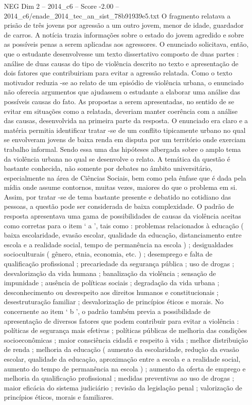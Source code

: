 \begin{textsample}{NEG Dim 2 – 2014\_c6 – Score -2.00 – 2014\_c6/enade\_2014\_tec\_an\_sist\_78b91939e5.txt}
O fragmento relatava a prisão de três jovens por agressão a um outro jovem, menor de idade, guardador de carros.
A notícia trazia informações sobre o estado do jovem agredido e sobre as possíveis penas a serem aplicadas aos agressores.
O enunciado solicitava, então, que o estudante desenvolvesse um texto dissertativo composto de duas partes : análise de duas causas do tipo de violência descrito no texto e apresentação de dois fatores que contribuiriam para evitar a agressão relatada.
Como o texto motivador reduzia -se ao relato de um episódio de violência urbana, o enunciado não oferecia argumentos que ajudassem o estudante a elaborar uma análise das possíveis causas do fato.
As propostas a serem apresentadas, no sentido de se evitar em situações como a relatada, deveriam manter coerência com a análise das causas, desenvolvida na primeira parte da resposta.
O enunciado era claro e a matéria permitia identificar tratar -se de um conflito tipicamente urbano no qual se envolveram jovens de baixa renda em disputa por um território onde exerciam trabalho informal.
Sendo essa uma das hipóteses albergada sobre o amplo tema da violência urbana no qual se desenvolve o relato.
A temática da questão é bastante conhecida, não somente por debates no âmbito universitário, especialmente na área de Ciências Sociais, bem como pela ênfase que é dada pela mídia onde assume contornos, muitas vezes, maiores do que o problema em si.
Assim, por tratar -se de tema bastante presente e debatido no cotidiano das pessoas, a questão pode ser considerada de baixa complexidade.
O padrão de resposta apresentava uma gama de possibilidades de causas da violência aceitas como corretas para o item ‘ a ’, tais como : problemas relacionados à educação ( baixa escolaridade, evasão escolar, qualidade da educação, distanciamento entre escola e a realidade social, tempo de permanência na escola ) ; desigualdades socioculturais ( gênero, etnia, economia, etc. ) ; desemprego e falta de qualificação profissional ; precariedade da segurança pública ; uso de drogas ; desvalorização da vida humana ; banalização da violência ; sensação de impunidade ; ausência de políticas sociais ; degradação da vida urbana ; desconhecimento ou desrespeito aos direitos humanos e constitucionais ; desestruturação familiar ; desvalorização de princípios éticos e morais.
No concernente ao item ‘ b ’, o padrão também previa a possibilidade de apresentação de diversos fatores que podem contribuir para evitar a violência : políticas de segurança mais efetivas ; políticas públicas de melhoria das condições socioeconômicas ; maior consciência cidadã e respeito à vida ; melhor distribuição de renda ; melhoria da educação ( aumento da escolaridade, redução da evasão escolar, qualidade da educação, aproximação entre a escola e a realidade social, aumento do tempo de permanência na escola ) ; aumento da oferta de emprego e melhoria da qualificação profissional ; medidas preventivas ao uso de drogas ; maior eficácia do sistema judiciário ; revisão da legislação penal ; valorização de princípios éticos, morais e familiares.

\end{textsample}
